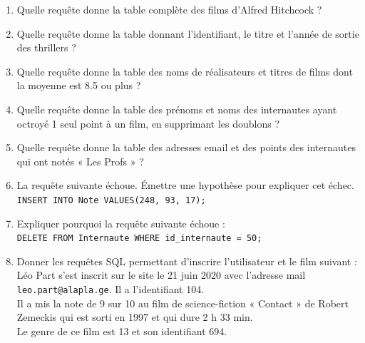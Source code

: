 \documentclass[a4paper,12pt,eval,firamath]{nsi}
\begin{document}
\begin{enumerate}
    \newpage      
    \item  Quelle requête donne la table complète des films d'Alfred Hitchcock ?\\
          

    \item  Quelle requête donne la table donnant l'identifiant, le titre et l'année de sortie des thrillers ?\\
          
          
    \item  Quelle requête donne la table des noms de réalisateurs et titres de films dont la moyenne est 8.5 ou plus ?\\
          
          
    \item  Quelle requête donne la table des prénoms et noms des internautes ayant octroyé 1 seul point à un film,
          en supprimant les doublons ?\\
          
    \newpage     
    \item Quelle requête donne la table des adresses email et des points des internautes qui ont notés « Les Profs » ?\\
          
          
    \item La requête suivante échoue. Émettre une hypothèse pour expliquer cet échec.\\
          \texttt{INSERT INTO Note VALUES(248, 93, 17);}\\
          
          
    \item Expliquer pourquoi la requête suivante échoue :\\
          \texttt{DELETE FROM Internaute WHERE id_internaute = 50;}\\
          
    \newpage      
    \item Donner les requêtes SQL permettant d'inscrire l'utilisateur et le film suivant :\\
          Léo Part s'est inscrit sur le site le 21 juin 2020 avec l'adresse mail \texttt{leo.part@alapla.ge}. Il a l'identifiant 104.\\
          Il a mis la note de 9 sur 10 au film de science-fiction « Contact » de Robert Zemeckis qui est sorti en 1997 et qui dure 2 h 33 min.\\
          Le genre de ce film est 13 et son identifiant 694.\\
          

\end{enumerate}
\end{document}
